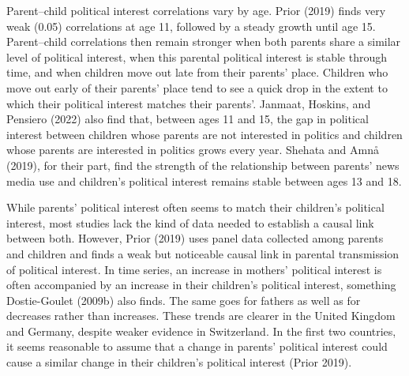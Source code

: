\documentclass[
  letterpaper,
  DIV=11,
  numbers=noendperiod]{scrreprt}
\begin{document}
Parent--child political interest correlations vary by age. Prior (2019)
finds very weak (0.05) correlations at age 11, followed by a steady
growth until age 15. Parent--child correlations then remain stronger
when both parents share a similar level of political interest, when this
parental political interest is stable through time, and when children
move out late from their parents' place. Children who move out early of
their parents' place tend to see a quick drop in the extent to which
their political interest matches their parents'. Janmaat, Hoskins, and
Pensiero (2022) also find that, between ages 11 and 15, the gap in
political interest between children whose parents are not interested in
politics and children whose parents are interested in politics grows
every year. Shehata and Amnå (2019), for their part, find the strength
of the relationship between parents' news media use and children's
political interest remains stable between ages 13 and 18.

While parents' political interest often seems to match their children's
political interest, most studies lack the kind of data needed to
establish a causal link between both. However, Prior (2019) uses panel
data collected among parents and children and finds a weak but
noticeable causal link in parental transmission of political interest.
In time series, an increase in mothers' political interest is often
accompanied by an increase in their children's political interest,
something Dostie-Goulet (2009b) also finds. The same goes for fathers as
well as for decreases rather than increases. These trends are clearer in
the United Kingdom and Germany, despite weaker evidence in Switzerland.
In the first two countries, it seems reasonable to assume that a change
in parents' political interest could cause a similar change in their
children's political interest (Prior 2019).
\end{document}
